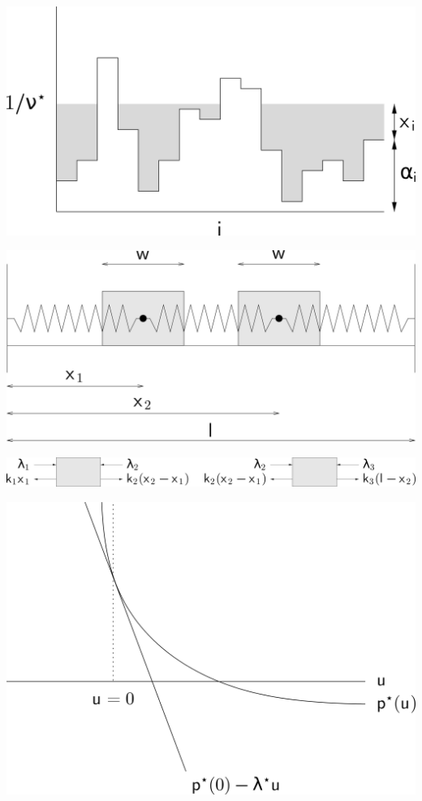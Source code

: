 \clearpage
\hfil\includegraphics[width=.5\textwidth]{../Graphics/246a.png}\hfil

\clearpage
\hfil\includegraphics[width=.5\textwidth]{../Graphics/246b.png}\hfil

\clearpage
\hfil\includegraphics[width=.5\textwidth]{../Graphics/247.png}\hfil

\clearpage
\hfil\includegraphics[width=.5\textwidth]{../Graphics/251.png}\hfil


